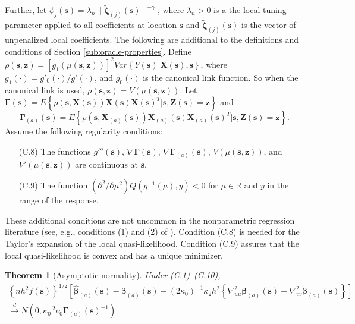 \documentclass[authoryear,review, 12pt]{elsarticle}
\newtheorem{thm}{Theorem}
\begin{document}
Further, let $\phi_{j}(\bm{s})=\lambda_{n}\|\tilde{\bm{\zeta}}_{(j)}(\bm{s})\|^{-\gamma}$,
where $\lambda_{n}>0$ is a the local tuning parameter applied to
all coefficients at location $\bm{s}$ and $\tilde{\bm{\zeta}}_{(j)}(\bm{s})$
is the vector of unpenalized local coefficients. The following are
additional to the definitions and conditions of Section \ref{sub:oracle-properties}.
Define $\rho(\bm{s},\bm{z})=\left[g_{1}\left(\mu(\bm{s},\bm{z})\right)\right]^{2}Var\left\{ Y(\bm{s})|\bm{X}(\bm{s}),\bm{s}\right\} $,
where $g_{1}(\cdot)=g'_{0}(\cdot)/g'(\cdot)$, and $g_{0}(\cdot)$
is the canonical link function. So when the canonical link is used,
$\rho(\bm{s},\bm{z})=V\left(\mu(\bm{s},\bm{z})\right)$. Let $\bm{\Gamma}\left(\bm{s}\right)=E\left\{ \rho\left(\bm{s},\bm{X}(\bm{s})\right)\bm{X}(\bm{s})\bm{X}(\bm{s})^{T}|\bm{s},\bm{Z}(\bm{s})=\bm{z}\right\} $
and 
\[
\bm{\Gamma}_{(a)}\left(\bm{s}\right)=E\left\{ \rho\left(\bm{s},\bm{X}_{(a)}(\bm{s})\right)\bm{X}_{(a)}(\bm{s})\bm{X}_{(a)}(\bm{s})^{T}|\bm{s},\bm{Z}(\bm{s})=\bm{z}\right\} .
\]
Assume the following regularity conditions:
\begin{itemize}
\item[(C.8)] The functions $g'''\left(\bm{s}\right)$, $\nabla\bm{\Gamma}\left(\bm{s}\right)$,
$\nabla\bm{\Gamma}_{(a)}\left(\bm{s}\right)$, $V\left(\mu\left(\bm{s},\bm{z}\right)\right)$,
and $V'\left(\mu\left(\bm{s},\bm{z}\right)\right)$ are continuous
at $\bm{s}$.
\item[(C.9)] The function $\left(\partial^{2}/\partial\mu^{2}\right)Q\left(g^{-1}\left(\mu\right),y\right)<0$
for $\mu\in\mathbb{R}$ and $y$ in the range of the response.
\end{itemize}
These additional conditions are not uncommon in the nonparametric
regression literature (see, e.g., conditions (1) and (2) of \citet{Cai-Fan-Li-2000}).
Condition (C.8) is needed for the Taylor's expansion of the local
quasi-likelihood. Condition (C.9) assures that the local quasi-likelihood
is convex and has a unique minimizer.
\begin{thm}[Asymptotic normality]
\label{theorem:normality-glm}  Under (C.1)--(C.10),
\begin{gather*}
\left\{ nh^{2}f(\bm{s})\right\} ^{1/2}\left[\hat{\bm{\beta}}_{(a)}(\bm{s})-\bm{\beta}_{(a)}(\bm{s})-\left(2\kappa_{0}\right)^{-1}\kappa_{2}h^{2}\left\{ \nabla_{uu}^{2}\bm{\beta}_{\left(a\right)}(\bm{s})+\nabla_{vv}^{2}\bm{\beta}_{\left(a\right)}(\bm{s})\right\} \right]\\
\xrightarrow{d}N\left(0,\kappa_{0}^{-2}\nu_{0}\bm{\Gamma}_{(a)}(\bm{s})^{-1}\right)
\end{gather*}
\end{thm}
\end{document}
